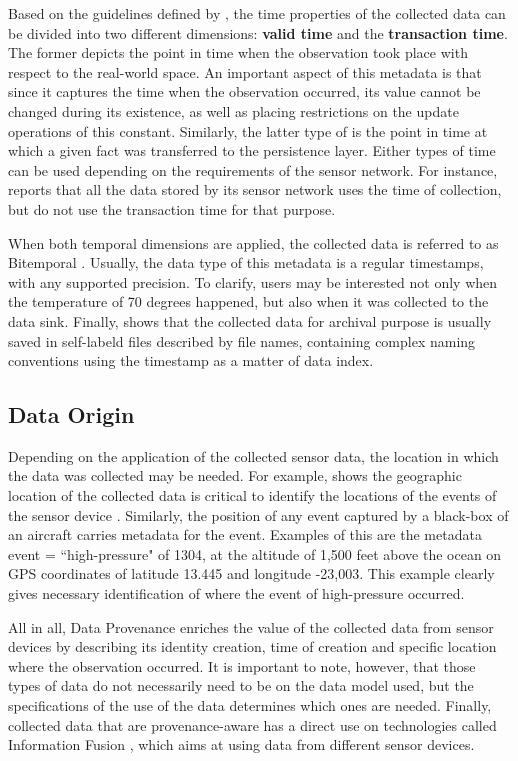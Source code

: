 Based on the guidelines defined by \cite{db-temporal}, the time properties of
the collected data can be divided into two different dimensions: \textbf{valid
time} and the \textbf{transaction time}. The former depicts the point in time
when the observation took place with respect to the real-world space. An
important aspect of this metadata is that since it captures the time when the
observation occurred, its value cannot be changed during its existence, as well
as placing restrictions on the update operations of this constant. Similarly,
the latter type of is the point in time at which a given fact was transferred
to the persistence layer. Either types of time can be used depending on the
requirements of the sensor network. For instance, \cite{sn-dataware-house}
reports that all the data stored by its sensor network uses the time of
collection, but do not use the transaction time for that purpose.

When both temporal dimensions are applied, the collected data is referred to as
Bitemporal \cite{db-temporal}. Usually, the data type of this metadata is a
regular timestamps, with any supported precision. To clarify, users may be
interested not only when the temperature of 70 degrees happened, but also when
it was collected to the data sink. Finally, \cite{sn-provenance} shows that
the collected data for archival purpose is usually saved in self-labeld
files described by file names, containing complex naming conventions using the 
timestamp as a matter of data index.

\subsection{Data Origin}

Depending on the application of the collected sensor data, the location in
which the data was collected may be needed. For example, \cite{sn-geo-metadata}
shows the geographic location of the collected data is critical to identify
the locations of the events of the sensor device \cite{sn-ex02}. Similarly,
the position of any event captured by a black-box of an aircraft carries 
metadata for the event. Examples of this are the metadata event =
``high-pressure" of 1304, at the altitude of 1,500 feet above the ocean on GPS
coordinates of latitude 13.445 and longitude -23,003. This example clearly
gives necessary identification of where the event of high-pressure occurred.

All in all, Data Provenance enriches the value of the collected data from
sensor devices by describing its identity creation, time of creation and
specific location where the observation occurred. It is important to note,
however, that those types of data do not necessarily need to be on the data
model used, but the specifications of the use of the data determines which
ones are needed. Finally, collected data that are provenance-aware has a direct
use on technologies called Information Fusion \cite{sn-info-fusion}, which aims
at using data from different sensor devices.


